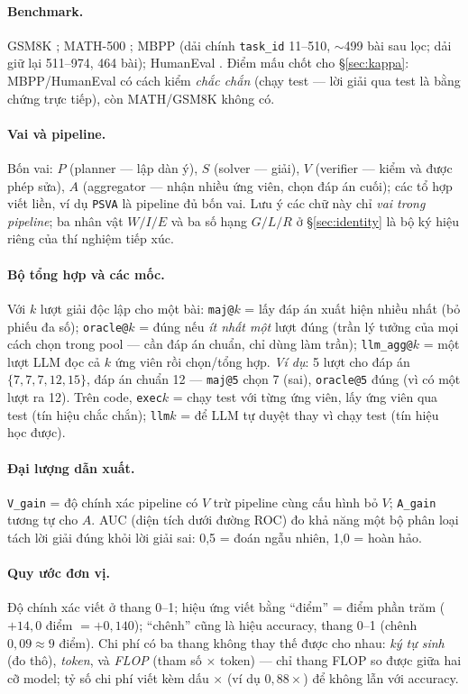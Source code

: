 \documentclass[12pt,a4paper]{article}
\begin{document}
\paragraph{Benchmark.} GSM8K \cite{cobbe2021}; MATH-500 \cite{hendrycks2021}; MBPP
\cite{austin2021} (dải chính \texttt{task\_id} 11--510, $\sim$499 bài sau lọc; dải giữ lại
511--974, 464 bài); HumanEval \cite{chen2021}. Điểm mấu chốt cho \S\ref{sec:kappa}:
MBPP/HumanEval có cách kiểm \emph{chắc chắn} (chạy test --- lời giải qua test là bằng chứng
trực tiếp), còn MATH/GSM8K không có.

\paragraph{Vai và pipeline.} Bốn vai: $P$ (planner --- lập dàn ý), $S$ (solver --- giải), $V$
(verifier --- kiểm và được phép sửa), $A$ (aggregator --- nhận nhiều ứng viên, chọn đáp án
cuối); các tổ hợp viết liền, ví dụ \texttt{PSVA} là pipeline đủ bốn vai. Lưu ý các chữ này chỉ
\emph{vai trong pipeline}; ba nhân vật $W/I/E$ và ba số hạng $G/L/R$ ở \S\ref{sec:identity} là
bộ ký hiệu riêng của thí nghiệm tiếp xúc.

\paragraph{Bộ tổng hợp và các mốc.} Với $k$ lượt giải độc lập cho một bài:
\texttt{maj@}$k$ = lấy đáp án xuất hiện nhiều nhất (bỏ phiếu đa số);
\texttt{oracle@}$k$ = đúng nếu \emph{ít nhất một} lượt đúng (trần lý tưởng của mọi cách chọn
trong pool --- cần đáp án chuẩn, chỉ dùng làm trần);
\texttt{llm\_agg@}$k$ = một lượt LLM đọc cả $k$ ứng viên rồi chọn/tổng hợp.
\emph{Ví dụ}: 5 lượt cho đáp án $\{7, 7, 7, 12, 15\}$, đáp án chuẩn 12 --- \texttt{maj@5} chọn
7 (sai), \texttt{oracle@5} đúng (vì có một lượt ra 12). Trên code, \texttt{exec}$k$ = chạy test
với từng ứng viên, lấy ứng viên qua test (tín hiệu chắc chắn); \texttt{llm}$k$ = để LLM tự
duyệt thay vì chạy test (tín hiệu học được).

\paragraph{Đại lượng dẫn xuất.} \texttt{V\_gain} = độ chính xác pipeline có $V$ trừ pipeline
cùng cấu hình bỏ $V$; \texttt{A\_gain} tương tự cho $A$. AUC (diện tích dưới đường ROC) đo khả
năng một bộ phân loại tách lời giải đúng khỏi lời giải sai: 0,5 = đoán ngẫu nhiên, 1,0 = hoàn
hảo.

\paragraph{Quy ước đơn vị.} Độ chính xác viết ở thang 0--1; hiệu ứng viết bằng ``điểm'' = điểm
phần trăm ($+14{,}0$ điểm $= +0{,}140$); ``chênh'' cũng là hiệu accuracy, thang 0--1 (chênh
$0{,}09 \approx 9$ điểm). Chi phí có ba thang không thay thế được cho nhau: \emph{ký tự sinh}
(đo thô), \emph{token}, và \emph{FLOP} (tham số $\times$ token) --- chỉ thang FLOP so được giữa
hai cỡ model; tỷ số chi phí viết kèm dấu $\times$ (ví dụ $0{,}88\times$) để không lẫn với
accuracy.
\end{document}
